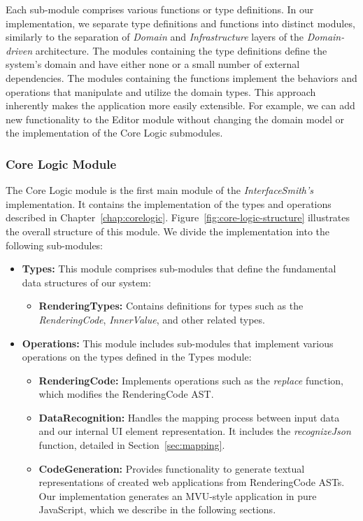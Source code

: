 Each sub-module comprises various functions or type definitions.
In our implementation, we separate type definitions and functions into distinct modules, similarly to the separation of \emph{Domain} and \emph{Infrastructure} layers of the \emph{Domain-driven} architecture.
The modules containing the type definitions define the system's domain and have either none or a small number of external dependencies.
The modules containing the functions implement the behaviors and operations that manipulate and utilize the domain types.
This approach inherently makes the application more easily extensible.
For example, we can add new functionality to the Editor module without changing the domain model or the implementation of the Core Logic submodules.

\subsubsection{Core Logic Module}
The Core Logic module is the first main module of the \emph{InterfaceSmith's} implementation.
It contains the implementation of the types and operations described in Chapter~\ref{chap:corelogic}.
Figure~\ref{fig:core-logic-structure} illustrates the overall structure of this module.
We divide the implementation into the following sub-modules:
\begin{itemize}
	\item \textbf{Types:} This module comprises sub-modules that define the fundamental data structures of our system:
	      \begin{itemize}
		      \item \textbf{RenderingTypes:} Contains definitions for types such as the \emph{RenderingCode}, \emph{InnerValue}, and other related types.
	      \end{itemize}

	\item \textbf{Operations:} This module includes sub-modules that implement various operations on the types defined in the Types module:
	      \begin{itemize}
		      \item \textbf{RenderingCode:} Implements operations such as the \emph{replace} function, which modifies the RenderingCode AST.


		      \item \textbf{DataRecognition:}  Handles the mapping process between input data and our internal UI element representation.
		            It includes the \emph{recognizeJson} function, detailed in Section~\ref{sec:mapping}.

		      \item\textbf{CodeGeneration:} Provides functionality to generate textual representations of created web applications from RenderingCode ASTs.
		            Our implementation generates an MVU-style application in pure JavaScript, which we describe in the following sections.
	      \end{itemize}
\end{itemize}

